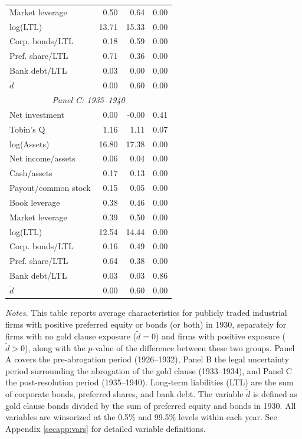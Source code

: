 \begin{table}[p]
\begin{threeparttable}
\begin{tabular}{lrrr}
            Market leverage & 0.50 & 0.64 & 0.00 \\
            log(LTL) & 13.71 & 15.33 & 0.00 \\
            Corp. bonds/LTL & 0.18 & 0.59 & 0.00 \\
            Pref. share/LTL & 0.71 & 0.36 & 0.00 \\
            Bank debt/LTL & 0.03 & 0.00 & 0.00 \\
            \ensuremath{\tilde{d}} & 0.00 & 0.60 & 0.00 \\
            \midrule
            \multicolumn{4}{c}{\textit{Panel C: 1935--1940}} \\
            \midrule
            Net investment & 0.00 & -0.00 & 0.41 \\
            Tobin's Q & 1.16 & 1.11 & 0.07 \\
            log(Assets) & 16.80 & 17.38 & 0.00 \\
            Net income/assets & 0.06 & 0.04 & 0.00 \\
            Cash/assets & 0.17 & 0.13 & 0.00 \\
            Payout/common stock & 0.15 & 0.05 & 0.00 \\
            Book leverage & 0.38 & 0.46 & 0.00 \\
            Market leverage & 0.39 & 0.50 & 0.00 \\
            log(LTL) & 12.54 & 14.44 & 0.00 \\
            Corp. bonds/LTL & 0.16 & 0.49 & 0.00 \\
            Pref. share/LTL & 0.64 & 0.38 & 0.00 \\
            Bank debt/LTL & 0.03 & 0.03 & 0.86 \\
            \ensuremath{\tilde{d}} & 0.00 & 0.60 & 0.00 \\
            \bottomrule
        \end{tabular}
    \end{threeparttable}
    
    \vspace*{3mm} \justifying \noindent
    \scriptsize{\textit{Notes.} This table reports average characteristics for publicly traded industrial firms with positive preferred equity or bonds (or both) in 1930, separately for firms with no gold clause exposure ($\tilde{d} = 0$) and firms with positive exposure ($\tilde{d} > 0$), along with the $p$-value of the difference between these two groups. Panel A covers the pre-abrogation period (1926--1932), Panel B the legal uncertainty period surrounding the abrogation of the gold clause (1933--1934), and Panel C the post-resolution period (1935--1940). Long-term liabilities (LTL) are the sum of corporate bonds, preferred shares, and bank debt. The variable $\tilde{d}$ is defined as gold clause bonds divided by the sum of preferred equity and bonds in 1930. All variables are winsorized at the 0.5\% and 99.5\% levels within each year. See Appendix \ref{secapp:vars} for detailed variable definitions.}
\end{table}